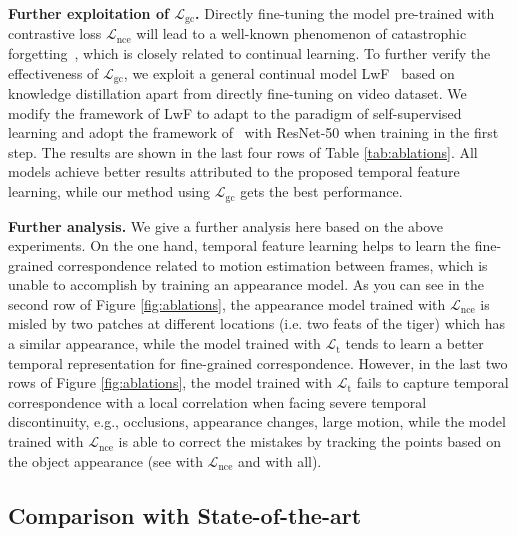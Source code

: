 \documentclass{article}
\begin{document}
\textbf{Further exploitation of $\mathcal{L}_{\mathrm{gc}}$.}  Directly fine-tuning the model pre-trained with contrastive loss $\mathcal{L}_{\mathrm{nce}}$ will lead to a well-known phenomenon of catastrophic forgetting~\cite{li2017learning}, which is closely related to continual learning. To further verify the effectiveness of  $\mathcal{L}_{\mathrm{gc}}$, we exploit a general continual model LwF~\cite{li2017learning}  based on knowledge distillation apart from directly fine-tuning on video dataset. We modify the framework of LwF to adapt to the paradigm of self-supervised learning and adopt the framework of~\cite{xie2021detco} with ResNet-50 when training in the first step. The results are shown in the last four rows of Table \ref{tab:ablations}. All models achieve better results attributed to the proposed temporal feature learning, while our method using $\mathcal{L}_{\mathrm{gc}}$ gets the best performance. 

\textbf{Further analysis.} 
We give a further analysis here based on the above experiments. On the one hand, temporal feature learning helps to learn the fine-grained correspondence related to motion estimation between frames, which is unable to accomplish by training an appearance model. As you can see in the second row of Figure \ref{fig:ablations}, the appearance model trained with $\mathcal{L}_{\mathrm{nce}}$ is misled by two patches at different locations (i.e. two feats of the tiger) which has a similar appearance, while the model trained with $\mathcal{L}_{\mathrm{t}}$ tends to learn a better temporal representation for fine-grained correspondence. However, in the last two rows of Figure \ref{fig:ablations}, the model trained with $\mathcal{L}_{\mathrm{t}}$ fails to capture temporal correspondence with a local correlation when facing severe temporal discontinuity, e.g., occlusions, appearance changes, large motion,  while the model trained with $\mathcal{L}_{\mathrm{nce}}$ is able to correct the mistakes by tracking the points based on the object appearance (see with $\mathcal{L}_{\mathrm{nce}}$ and with all).

\subsection{Comparison with State-of-the-art}
\end{document}
